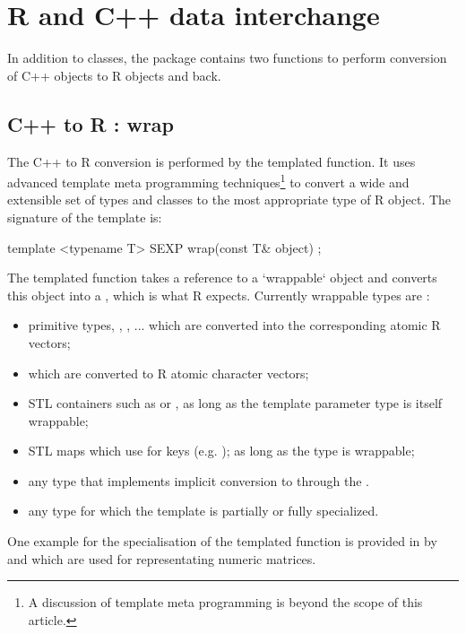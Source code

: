 \section{R and C++ data interchange}

In addition to classes, the  package contains two %
functions to perform conversion of C++ objects to R objects and back. 

\subsection{C++ to R : wrap}

The C++ to R conversion is performed by the  templated
function. It uses advanced template meta programming techniques\footnote{A
  discussion of template meta programming is beyond the scope of this
  article.}  to convert a wide and extensible set of types and classes to the
most appropriate type of R object. The signature of the  template
is:

\begin{example}
template <typename T> 
SEXP wrap(const T& object) ;
\end{example}

The templated function takes a reference to a `wrappable` 
object and converts this object into a , which is what R expects. 
Currently wrappable types are :
\begin{itemize}
\item primitive types, , , ... which are converted 
into the corresponding atomic R vectors;
\item {} which are converted to R atomic character vectors;
\item STL containers such as  or , 
as long as the template parameter type  is itself wrappable;
\item STL maps which use  for keys 
(e.g. ); as long as 
the type  is wrappable;
\item any type that implements implicit conversion to  through the 
.
\item any type for which the  template is partially or fully 
specialized.
\end{itemize}
One example for the specialisation of the templated  function is
provided in  \citep{cran:rinside} by  and  which are used for
representating numeric matrices.

